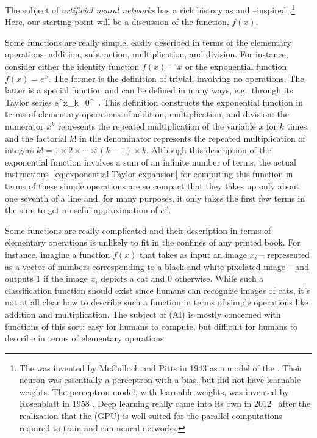 The subject of \emph{artificial neural networks} has a rich history as  and --inspired
.\footnote{The  was invented by McCulloch and Pitts in 1943 \cite{mcculloch1943logical} as a model of the . Their neuron was essentially a perceptron with a bias, but did not have learnable weights. The perceptron model, with learnable weights, was invented by Rosenblatt in 1958 \cite{rosenblatt1958perceptron}.
Deep learning 
really came into its own
in 2012~\cite{ImageNet2012} after the realization that the  (GPU) is well-suited for the parallel computations required to train and run neural networks.} Here, our starting point will be a discussion of the function, $f(x)$.

Some functions are really simple, %
easily described in terms of the elementary operations: addition, subtraction, multiplication, and division.
For instance, consider either the identity function $f(x)=x$ or the exponential function $f(x)=e^{x}$. The former is the definition of trivial, involving no operations. The latter is a special function and can be defined in many ways, e.g.~through its Taylor series
\be\label{eq:exponential-Taylor-expansion}
e^{x}\equiv\sum_{k=0}^\infty {}\, .
\ee
This definition constructs the exponential function in terms of elementary operations of addition, multiplication, and division: the numerator $x^k$ represents the repeated multiplication of the variable $x$ for $k$ times, and the factorial $k!$ in the denominator represents the repeated multiplication of integers $k!=1 \times 2 \times \cdots \times (k-1) \times k$. Although this description of the exponential function involves a sum of an infinite number of terms, the actual instructions~\eqref{eq:exponential-Taylor-expansion} for computing this function in terms of these simple operations are so compact that they takes up only about one seventh of a line and, for many purposes, it only takes the first few terms in the sum
to get a
useful approximation of $e^x$.

Some functions are really complicated and their description in terms of elementary operations is unlikely to fit in the confines of any printed book. For instance, imagine a function $f(x)$ that takes as input an image $x_i$ 
-- represented as a vector of numbers corresponding to a black-and-white pixelated image -- 
and outputs $1$ if the image $x_i$ depicts a cat and $0$ otherwise. While such a classification function should exist since humans can recognize images of cats, it's not at all clear how to describe such a function in terms of simple operations like addition and multiplication. The subject of  (AI) is mostly concerned with functions of this sort: easy for humans to compute, but difficult for humans to describe in terms of elementary operations. 


